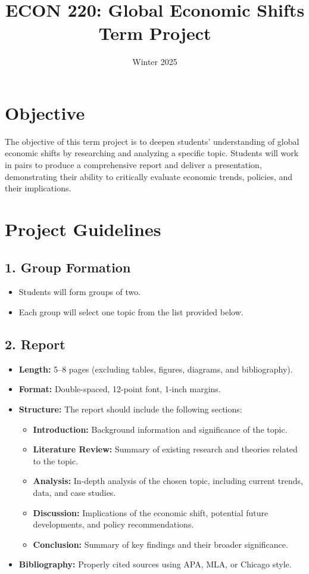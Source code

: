 \documentclass[12pt]{article}
\title{ECON 220: Global Economic Shifts \\ Term Project}
\date{Winter 2025}
\begin{document}
\maketitle

\section*{Objective}
The objective of this term project is to deepen students' understanding of global economic shifts by researching and analyzing a specific topic. Students will work in pairs to produce a comprehensive report and deliver a presentation, demonstrating their ability to critically evaluate economic trends, policies, and their implications.

\section*{Project Guidelines}

\subsection*{1. Group Formation}
\begin{itemize}
    \item Students will form groups of two.
    \item Each group will select one topic from the list provided below.
\end{itemize}

\subsection*{2. Report}
\begin{itemize}
    \item \textbf{Length:} 5--8 pages (excluding tables, figures, diagrams, and bibliography).
    \item \textbf{Format:} Double-spaced, 12-point font, 1-inch margins.
    \item \textbf{Structure:} The report should include the following sections:
    \begin{itemize}
        \item \textbf{Introduction:} Background information and significance of the topic.
        \item \textbf{Literature Review:} Summary of existing research and theories related to the topic.
        \item \textbf{Analysis:} In-depth analysis of the chosen topic, including current trends, data, and case studies.
        \item \textbf{Discussion:} Implications of the economic shift, potential future developments, and policy recommendations.
        \item \textbf{Conclusion:} Summary of key findings and their broader significance.
    \end{itemize}
    \item \textbf{Bibliography:} Properly cited sources using APA, MLA, or Chicago style.
\end{itemize}
\newpage
\end{document}
